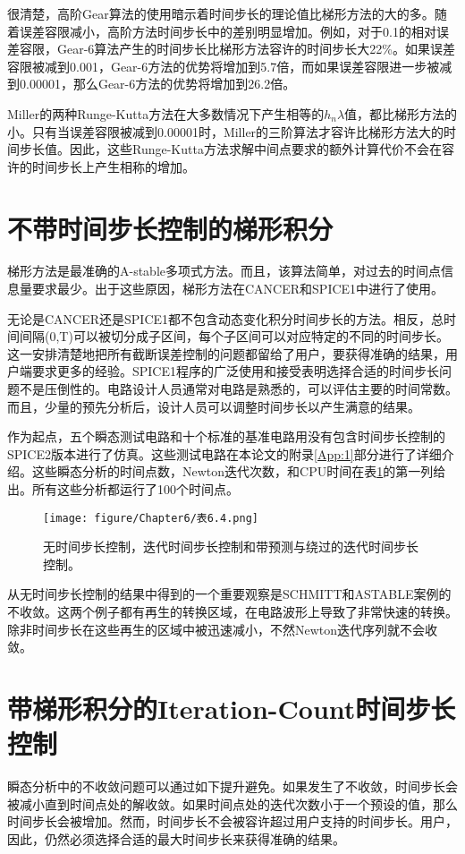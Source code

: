 很清楚，高阶Gear算法的使用暗示着时间步长的理论值比梯形方法的大的多。随着误差容限减小，高阶方法时间步长中的差别明显增加。例如，对于0.1的相对误差容限，Gear-6算法产生的时间步长比梯形方法容许的时间步长大22\%。如果误差容限被减到0.001，Gear-6方法的优势将增加到5.7倍，而如果误差容限进一步被减到0.00001，那么Gear-6方法的优势将增加到26.2倍。

Miller的两种Runge-Kutta方法在大多数情况下产生相等的$h_n\lambda$值，都比梯形方法的小。只有当误差容限被减到0.00001时，Miller的三阶算法才容许比梯形方法大的时间步长值。因此，这些Runge-Kutta方法求解中间点要求的额外计算代价不会在容许的时间步长上产生相称的增加。

\section{不带时间步长控制的梯形积分}
梯形方法是最准确的A-stable多项式方法\cite{ref-63}。而且，该算法简单，对过去的时间点信息量要求最少。出于这些原因，梯形方法在CANCER\cite{ref-2}和SPICE1中进行了使用。

无论是CANCER还是SPICE1都不包含动态变化积分时间步长的方法。相反，总时间间隔(0,T)可以被切分成子区间，每个子区间可以对应特定的不同的时间步长。这一安排清楚地把所有截断误差控制的问题都留给了用户，要获得准确的结果，用户端要求更多的经验。SPICE1程序的广泛使用和接受表明选择合适的时间步长问题不是压倒性的。电路设计人员通常对电路是熟悉的，可以评估主要的时间常数。而且，少量的预先分析后，设计人员可以调整时间步长以产生满意的结果。

作为起点，五个瞬态测试电路和十个标准的基准电路用没有包含时间步长控制的SPICE2版本进行了仿真。这些测试电路在本论文的附录\ref{App:1}部分进行了详细介绍。这些瞬态分析的时间点数，Newton迭代次数，和CPU时间在表\ref{表6.4}的第一列给出。所有这些分析都运行了100个时间点。
\begin{figure}[htbp]
\small
    \centering
    \texttt{[image: figure/Chapter6/表6.4.png]}
    \caption{无时间步长控制，迭代时间步长控制和带预测与绕过的迭代时间步长控制。}
    \label{表6.4}
\end{figure}

从无时间步长控制的结果中得到的一个重要观察是SCHMITT和ASTABLE案例的不收敛。这两个例子都有再生的转换区域，在电路波形上导致了非常快速的转换。除非时间步长在这些再生的区域中被迅速减小，不然Newton迭代序列就不会收敛。

\section{带梯形积分的Iteration-Count时间步长控制}
瞬态分析中的不收敛问题可以通过如下提升避免。如果发生了不收敛，时间步长会被减小直到时间点处的解收敛。如果时间点处的迭代次数小于一个预设的值，那么时间步长会被增加。然而，时间步长不会被容许超过用户支持的时间步长。用户，因此，仍然必须选择合适的最大时间步长来获得准确的结果。

